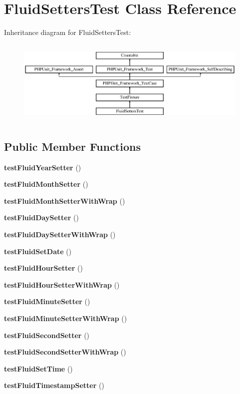 \section{Fluid\+Setters\+Test Class Reference}
\label{class_fluid_setters_test}
Inheritance diagram for Fluid\+Setters\+Test\+:\begin{figure}[H]
\begin{center}
\leavevmode
\includegraphics[height=4.129793cm]{class_fluid_setters_test}
\end{center}
\end{figure}
\subsection*{Public Member Functions}
\begin{DoxyCompactItemize}
\item 
{\bf test\+Fluid\+Year\+Setter} ()
\item 
{\bf test\+Fluid\+Month\+Setter} ()
\item 
{\bf test\+Fluid\+Month\+Setter\+With\+Wrap} ()
\item 
{\bf test\+Fluid\+Day\+Setter} ()
\item 
{\bf test\+Fluid\+Day\+Setter\+With\+Wrap} ()
\item 
{\bf test\+Fluid\+Set\+Date} ()
\item 
{\bf test\+Fluid\+Hour\+Setter} ()
\item 
{\bf test\+Fluid\+Hour\+Setter\+With\+Wrap} ()
\item 
{\bf test\+Fluid\+Minute\+Setter} ()
\item 
{\bf test\+Fluid\+Minute\+Setter\+With\+Wrap} ()
\item 
{\bf test\+Fluid\+Second\+Setter} ()
\item 
{\bf test\+Fluid\+Second\+Setter\+With\+Wrap} ()
\item 
{\bf test\+Fluid\+Set\+Time} ()
\item 
{\bf test\+Fluid\+Timestamp\+Setter} ()
\end{DoxyCompactItemize}
